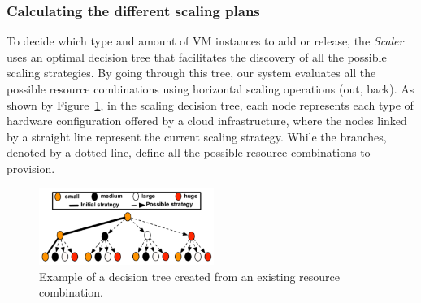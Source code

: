 

\subsubsection{Calculating the different scaling plans}

To decide which type and amount of VM instances to add or release, the \emph{Scaler} uses an optimal decision tree that facilitates the discovery of all the possible scaling strategies. By going through this tree, our system evaluates all the possible resource combinations using horizontal scaling operations (out, back). As shown by Figure~\ref{fig:scalingTree}, in the scaling decision tree, each node represents each type of hardware configuration offered by a cloud infrastructure, where the nodes linked by a straight line represent the current scaling strategy. While the branches, denoted by a dotted line, define all the possible resource combinations to provision. 

\begin{figure}[t]
  \begin{center}
    \includegraphics[width=0.7\linewidth,height=2.5cm]{images/optimalTree_initial}
  \end{center}
\vspace{-3mm}
  \caption{Example of a decision tree created from an existing resource combination.}
  \label{fig:scalingTree}
\end{figure}

